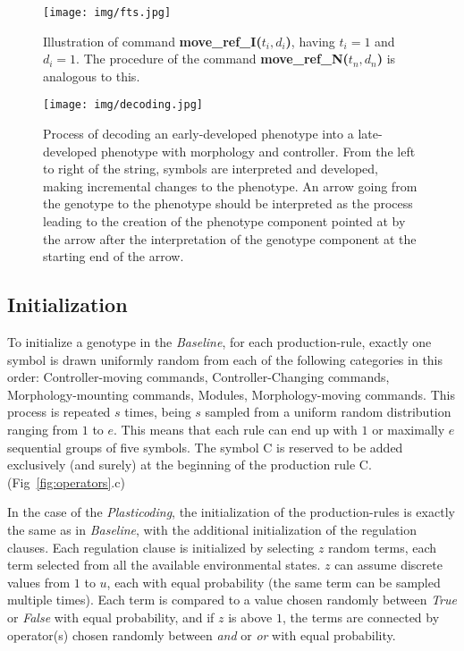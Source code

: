 \documentclass[utf8]{frontiersSCNS} %
\begin{document}
  \begin{figure}[t]
    \begin{center}
      \texttt{[image: img/fts.jpg]}
    \caption{Illustration of command \textbf{move\_ref\_I($t_i, d_i$)}, having $t_i=1$ and $d_i=1$. The procedure of the command \textbf{move\_ref\_N($t_n, d_n$)} is analogous to this.}
        \label{fig:fts}
    \end{center}
    \end{figure}
 
\begin{figure}[t]
\begin{center}
\texttt{[image: img/decoding.jpg]}
\caption{Process of decoding an early-developed phenotype into a late-developed phenotype with morphology and controller. From the left to right of the string, symbols are interpreted and developed, making incremental changes to the phenotype. An arrow going from the genotype to the phenotype should be interpreted as the process leading to the creation of the phenotype component pointed at by the arrow after the interpretation of the genotype component at the starting end of the arrow.}
\label{fig:decoding}
\end{center}
\end{figure}

 


 

\subsection{Initialization}
\label{sec:genoinit}


To initialize a genotype in the \textit{Baseline}, for each production-rule, exactly one symbol is drawn uniformly random from each of the following categories in this order: Controller-moving commands, Controller-Changing commands, Morphology-mounting commands, Modules, Morphology-moving commands. This process is repeated $s$ times, being $s$ sampled from a uniform random distribution ranging from $1$ to $e$. This means that each rule can end up with $1$ or maximally $e$ sequential groups of five symbols. The symbol C is reserved to be added exclusively (and surely) at the beginning of the production rule C. (Fig~\ref{fig:operators}.c) 

In the case of the \textit{Plasticoding}, the initialization of the production-rules is exactly the same as in \textit{Baseline}, with the additional initialization of the regulation clauses. Each regulation clause is initialized by selecting $z$ random terms, each term selected from all the available environmental states. $z$ can assume discrete values from $1$ to $u$, each with equal probability (the same term can be sampled multiple times). Each term is compared to a value chosen randomly between \textit{True} or \textit{False} with equal probability, and if $z$ is above $1$, the terms are connected by operator(s) chosen randomly between \textit{and} or \textit{or} with equal probability.
\end{document}
